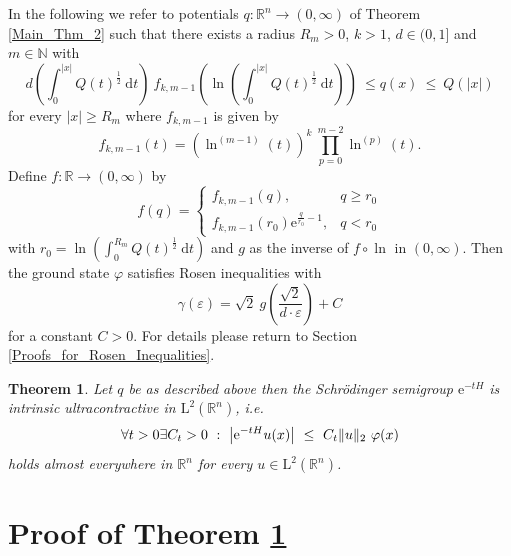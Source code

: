 \documentclass[12pt,longbibliography]{article}
\def\N{\mathbb{N}}
\def\R{\mathbb{R}}
\newtheorem{thm}{Theorem}[section]
\theoremstyle{definition}
\theoremstyle{remark}
\theoremstyle{example}
\begin{document}
In the following we refer to potentials $q \colon \R^{n} \to (0,\infty)$ of Theorem \ref{Main_Thm_2} such that
there exists a radius $R_{m} > 0$, $k>1$, $d \in (0,1]$ and $m \in \N$ with 
\begin{equation}
d \left( \int_{0}^{ |x|} Q(t)^{\frac{1}{2}} \ \mathrm{d}t \right) \
f_{k, m-1} \left( \ln \left( \int_{0}^{ |x|} Q(t)^{\frac{1}{2}} \ \mathrm{d}t \right) \right) \ \leq q(x) \ \leq \ Q \left( |x| \right)
\end{equation}
for every $|x| \geq R_{m}$ where $f_{k, m-1}$ is given by
\begin{equation}
f_{k, m-1} (t) = \left( \ln^{(m-1)}(t) \right)^{k} \ \prod_{p=0}^{m-2} \ln^{(p)}(t).
\end{equation} 
Define $f \colon \R \to (0,\infty)$ by
$$
f(q)=\left\{\begin{array}{ll} 
	f_{k,m-1}(q), & q \geq r_{0} \\
         f_{k,m-1}\left( r_{0} \right)\mathrm{e}^{\frac{q}{r_{0}}-1}, & q < r_{0}
\end{array}\right. 
$$
with $r_{0} = \ln \left( \int_{0}^{R_{m}} Q(t)^{\frac{1}{2}} \ \mathrm{d}t \right)$ and $g$ as the inverse of 
$f \circ \ln$ in $(0,\infty)$. Then the ground state 
$\varphi$ satisfies Rosen inequalities with
\begin{equation} \label{gamma}
\gamma(\varepsilon) = \sqrt{2} \ g\left( \frac{\sqrt{2}}{d \cdot \varepsilon} \right) + C
\end{equation}
for a constant $C > 0$. For details please return to Section \ref{Proofs_for_Rosen_Inequalities}.\\

\begin{thm}\label{IU_of_e^{-tH}}
Let $q$ be as described above then the Schrödinger semigroup $\mathrm{e}^{-tH}$ is 
intrinsic ultracontractive in $\mathrm{L}^{2}(\R^{n})$, i.e.
\begin{equation}
\forall t > 0 \exists C_{t} > 0 \ : \  \bigl| \mathrm{e}^{-tH}u (x) \bigr| \ \leq \ C_{t} \|u\|_{2} \ \varphi (x) \\
\end{equation}
holds almost everywhere in $\R^{n}$ for every $u \in \mathrm{L}^{2}(\R^{n})$.\\
\end{thm}



\section{Proof of Theorem \ref{IU_of_e^{-tH}}} \label{Proof_IU}
\end{document}
